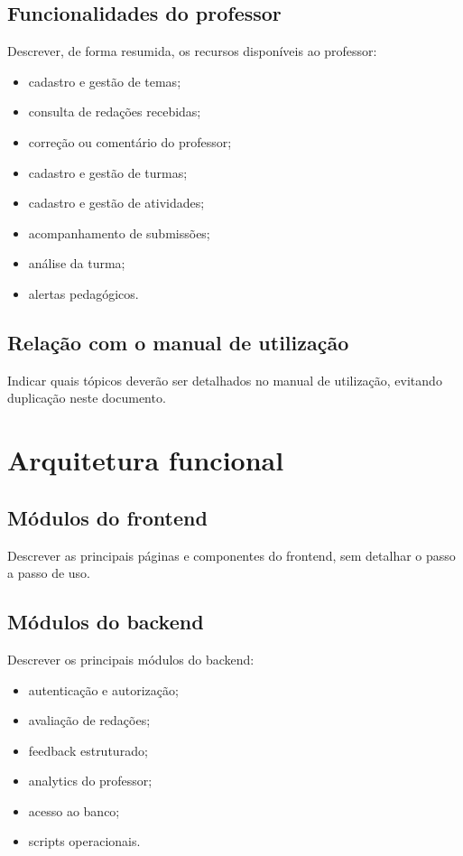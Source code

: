 \documentclass[12pt,a4paper]{article}
\begin{document}
\subsection{Funcionalidades do professor}
Descrever, de forma resumida, os recursos disponíveis ao professor:
\begin{itemize}
    \item cadastro e gestão de temas;
    \item consulta de redações recebidas;
    \item correção ou comentário do professor;
    \item cadastro e gestão de turmas;
    \item cadastro e gestão de atividades;
    \item acompanhamento de submissões;
    \item análise da turma;
    \item alertas pedagógicos.
\end{itemize}

\subsection{Relação com o manual de utilização}
Indicar quais tópicos deverão ser detalhados no manual de utilização, evitando duplicação neste documento.

\section{Arquitetura funcional}

\subsection{Módulos do frontend}
Descrever as principais páginas e componentes do frontend, sem detalhar o passo a passo de uso.

\subsection{Módulos do backend}
Descrever os principais módulos do backend:
\begin{itemize}
    \item autenticação e autorização;
    \item avaliação de redações;
    \item feedback estruturado;
    \item analytics do professor;
    \item acesso ao banco;
    \item scripts operacionais.
\end{itemize}
\end{document}
